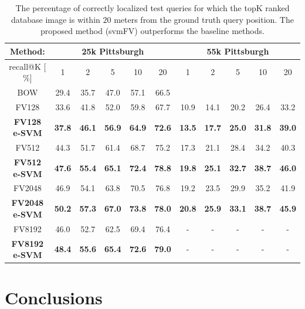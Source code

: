 \documentclass[table]{article} %
\begin{document}
\begin{table}
\begin{centering}
	\begin{tabularx}{0.94\linewidth}{|c|c c c c c|c c c c c|}
		\hline 
		\rowcolor{maroon!50}
		Method: & \multicolumn{5}{c|}{25k Pittsburgh} & \multicolumn{5}{c|}{55k Pittsburgh} \\
		\hline 
		\hline 
		\rowcolor{maroon!50}
		recall@K [$\%$] & 1 & 2 & 5 & 10 & 20 & 1 & 2 & 5 & 10 & 20\\
		\hline
		\rowcolor{maroon!10}
		BOW & 29.4 & 35.7 & 47.0 & 57.1 & 66.5 &  &  &  &  & \\
        \hline
		\rowcolor{maroon!10}
		FV128         & 33.6 & 41.8 & 52.0 & 59.8 & 67.7 & 10.9 & 14.1 & 20.2 & 26.4 & 33.2 \\
		\rowcolor{maroon!10}
		\textbf{FV128 e-SVM}   & \textbf{37.8}  & \textbf{46.1} & \textbf{56.9} & \textbf{64.9} & \textbf{72.6}  &
                                 \textbf{13.5}  &  \textbf{17.7}  &  \textbf{25.0}  &  \textbf{31.8}  &  \textbf{39.0} \\
        \hline
        \rowcolor{maroon!10}
        FV512         & 44.3 & 51.7 & 61.4 & 68.7 & 75.2 & 17.3 &  21.1 &  28.4 &  34.2 &  40.3 \\
        \rowcolor{maroon!10}
        \textbf{FV512 e-SVM}   & \textbf{47.6}  & \textbf{55.4} & \textbf{65.1} & \textbf{72.4} & \textbf{78.8}  &
                                 \textbf{19.8} &  \textbf{25.1} &  \textbf{32.7}  & \textbf{38.7} &  \textbf{46.0} \\
        \hline
		\rowcolor{maroon!10}
		FV2048        & 46.9  & 54.1 & 63.8 & 70.5 & 76.8 & 19.2 & 23.5 & 29.9 &  35.2 &  41.9 \\
		\rowcolor{maroon!10}
		\textbf{FV2048 e-SVM}  & \textbf{50.2} & \textbf{57.3} & \textbf{67.0} & \textbf{73.8} & \textbf{78.0} &
        \textbf{20.8} & \textbf{25.9} & \textbf{33.1} & \textbf{38.7} & \textbf{45.9}\\
        \hline
        \rowcolor{maroon!10}
        FV8192        & 46.0  & 52.7 & 62.5 & 69.4 & 76.4 & - & - & - & - &  -   \\
        \rowcolor{maroon!10}
        \textbf{FV8192 e-SVM}  & \textbf{48.4} & \textbf{55.6} & \textbf{65.4} & \textbf{72.6} & \textbf{79.0} & - & - & - & - & -\\
		\hline
	\end{tabularx}
	\caption{ \textcolor{myRed}{}
		The percentage of correctly localized test queries for which the topK ranked database image is within $20$ meters from the ground truth query position. The proposed method (svmFV) outperforms the baseline methods.
		}
	\label{tab:recall}
\end{centering}
\end{table}


\section{Conclusions}





\small{
	
	
	}
\end{document}
